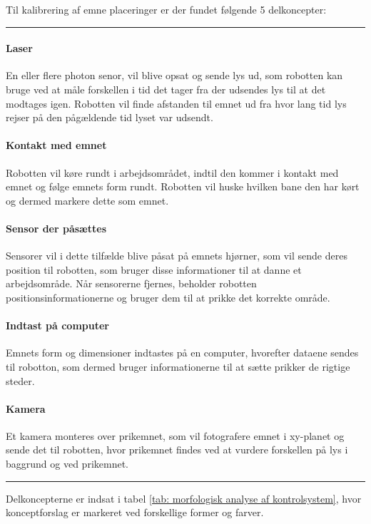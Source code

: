 Til kalibrering af emne placeringer er der fundet følgende 5 delkoncepter: \plainbreak{0.5}
\paragraph{Laser}
En eller flere photon senor, vil blive opsat og sende lys ud, som robotten kan bruge ved at måle forskellen i tid det tager fra der udsendes lys til at det modtages igen. Robotten vil finde afstanden til emnet ud fra hvor lang tid lys rejser på den pågældende tid lyset var udsendt.

\paragraph{Kontakt med emnet}
Robotten vil køre rundt i arbejdsområdet, indtil den kommer i kontakt med emnet og følge emnets form rundt. Robotten vil huske hvilken bane den har kørt og dermed markere dette som emnet.

\paragraph{Sensor der påsættes}
Sensorer vil i dette tilfælde blive påsat på emnets hjørner, som vil sende deres position til robotten, som bruger disse informationer til at danne et arbejdsområde. Når sensorerne fjernes, beholder robotten positionsinformationerne og bruger dem til at prikke det korrekte område.

\paragraph{Indtast på computer}
Emnets form og dimensioner indtastes på en computer, hvorefter dataene sendes til robotton, som dermed bruger informationerne til at sætte prikker de rigtige steder. 

\paragraph{Kamera} 
Et kamera monteres over prikemnet, som vil fotografere emnet i xy-planet og sende det til robotten, hvor prikemnet findes ved at vurdere forskellen på lys i baggrund og ved prikemnet. \plainbreak{1}

Delkoncepterne er indsat i tabel \ref{tab: morfologisk analyse af kontrolsystem}, hvor konceptforslag er markeret ved forskellige former og farver. 


